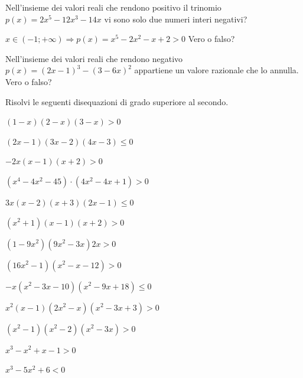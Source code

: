 \begin{esercizio}
\label{ese:4.35}
Nell'insieme dei valori reali che rendono positivo il trinomio 
\(p(x)=2x^5-12x^3-14x\) vi sono solo due numeri interi negativi?
\end{esercizio}

\begin{esercizio}
\label{ese:4.36}
\(x\in (-1;+\infty )\Rightarrow p(x)=x^5-2x^2-x+2>0\) Vero o falso?
\end{esercizio}

\begin{esercizio}
\label{ese:4.37}
Nell'insieme dei valori reali che rendono negativo \(p(x)=(2x-1)^3-(3-6x)^2\) 
appartiene un valore razionale che lo annulla. Vero o falso?
\end{esercizio}

\begin{esercizio}[*]
\label{ese:4.38}
Risolvi le seguenti disequazioni di grado superiore al secondo.
\begin{enumeratea}
\item \((1-x)(2-x)(3-x)>0\) 
\item \((2x-1)(3x-2)(4x-3) \leqslant 0\) 
\item \(-2x(x-1)(x+2)>0\) 
\item \( \left(x^4-4x^2-45\right)\cdot \left(4x^2-4x+1\right)>0 \) 
\sol{}
\item \(3x(x-2)(x+3)(2x-1) \leqslant 0\) 
\item \(\left(x^2+1\right)(x-1)(x+2)>0\) 
\item \(\left(1-9x^2\right)\left(9x^2-3x\right)2x>0\) 
\item \(\left(16x^2-1\right)\left(x^2-x-12\right)>0\) 
\item \(-x\left(x^2-3x-10\right)\left(x^2-9x+18\right) \leqslant 0\)
\item \(x^2(x-1)\left(2x^2-x\right)\left(x^2-3x+3\right)>0\)
\item \(\left(x^2-1\right)\left(x^2-2\right)\left(x^2-3x\right)>0\)
\item \(x^3-x^2+x-1>0\) 
\item \(x^3-5x^2+6<0\) 

\end{enumeratea}
\end{esercizio}
